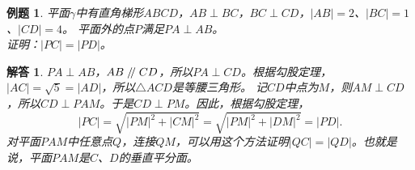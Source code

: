 \documentclass[12pt,UTF8]{ctexbook}
\newtheorem{et}{例题}[section]
\newtheorem*{so}{解答}
\renewcommand\parallel{\mathrel{/\mskip-4mu/}}
\begin{document}
\begin{et}\label{et:1-3-20}
    平面$\gamma$中有直角梯形$ABCD$，$AB \perp BC$，$BC \perp CD$，$|AB|= 2$、$|BC| = 1$、$|CD| = 4$。
    平面外的点$P$满足$PA \perp AB$。\\
    证明：$|PC| = |PD|$。
\end{et}
\begin{so}
    $PA \perp AB$，$AB \parallel CD$，所以$PA \perp CD$。根据勾股定理，$|AC| = \sqrt{5} = |AD|$，所以$\triangle ACD$是等腰三角形。
    记$CD$中点为$M$，则$AM \perp CD$，所以$CD \perp PAM$。于是$CD \perp PM$。因此，根据勾股定理，
    $$ |PC| = \sqrt{|PM|^2 + |CM|^2} = \sqrt{|PM|^2 + |DM|^2} = |PD|.$$
    对平面$PAM$中任意点$Q$，连接$QM$，可以用这个方法证明$|QC| = |QD|$。也就是说，平面$PAM$是$C$、$D$的垂直平分面。\\

\end{so}
\end{document}
